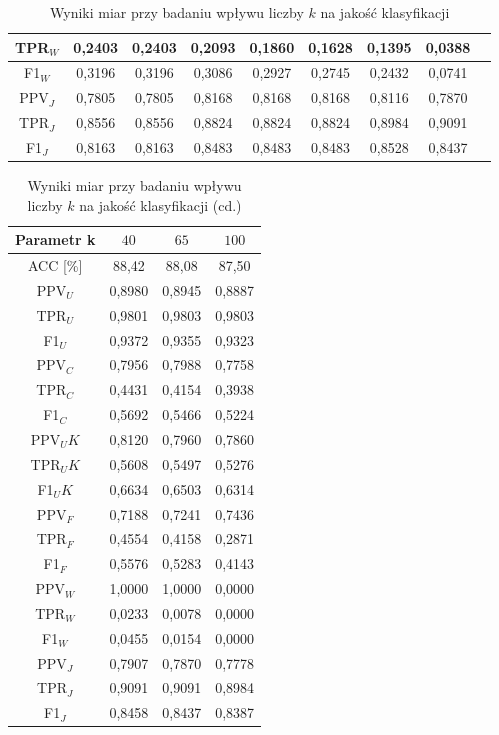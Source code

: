 \documentclass{article}
\begin{document}
\begin{table}[h!]
\begin{tabular}{|c|c|c|c|c|c|c|c|c|}
    TPR\(_W\) & 0,2403 & 0,2403 & 0,2093 & 0,1860& 0,1628& 0,1395& 0,0388\\ \hline
    F1\(_W\) & 0,3196 & 0,3196 & 0,3086 & 0,2927& 0,2745& 0,2432& 0,0741\\ \hline
    PPV\(_J\) & 0,7805 & 0,7805 & 0,8168 & 0,8168& 0,8168& 0,8116& 0,7870\\ \hline
    TPR\(_J\) & 0,8556 & 0,8556 & 0,8824 &  0,8824& 0,8824& 0,8984& 0,9091\\ \hline
    F1\(_J\) & 0,8163 & 0,8163 & 0,8483 &  0,8483& 0,8483& 0,8528& 0,8437\\ \hline
    \end{tabular}
    \caption{Wyniki miar przy badaniu wpływu liczby \(k\) na jakość klasyfikacji}
\end{table}
\begin{table}[h!]
    \centering
    \begin{tabular}{|c|c|c|c|}
    \hline
    \textbf{Parametr k} & \textbf{\(40\)} & \textbf{\(65\)} & \textbf{\(100\)}\\ \hline
    ACC [\%]  & 88,42 & 88,08 & 87,50\\ \hline
    PPV\(_U\) & 0,8980& 0,8945 & 0,8887\\ \hline
    TPR\(_U\) & 0,9801& 0,9803 & 0,9803\\ \hline
    F1\(_U\) & 0,9372& 0,9355& 0,9323\\ \hline
    PPV\(_C\) & 0,7956& 0,7988& 0,7758\\ \hline
    TPR\(_C\) & 0,4431& 0,4154& 0,3938\\ \hline
    F1\(_C\) & 0,5692& 0,5466& 0,5224\\ \hline
    PPV\(_UK\) & 0,8120& 0,7960& 0,7860\\ \hline
    TPR\(_UK\) & 0,5608& 0,5497& 0,5276\\ \hline
    F1\(_UK\) & 0,6634& 0,6503& 0,6314\\ \hline
    PPV\(_F\) & 0,7188& 0,7241 & 0,7436\\ \hline
    TPR\(_F\) & 0,4554& 0,4158 & 0,2871\\ \hline
    F1\(_F\) & 0,5576& 0,5283 & 0,4143\\ \hline
    PPV\(_W\) & 1,0000& 1,0000 & 0,0000\\ \hline
    TPR\(_W\) & 0,0233& 0,0078& 0,0000\\ \hline
    F1\(_W\) & 0,0455& 0,0154& 0,0000\\ \hline
    PPV\(_J\) & 0,7907& 0,7870& 0,7778\\ \hline
    TPR\(_J\) & 0,9091& 0,9091& 0,8984\\ \hline
    F1\(_J\) & 0,8458& 0,8437& 0,8387\\ \hline
    \end{tabular}
    \caption{Wyniki miar przy badaniu wpływu liczby \(k\) na jakość klasyfikacji (cd.)}
\end{table}
\end{document}
